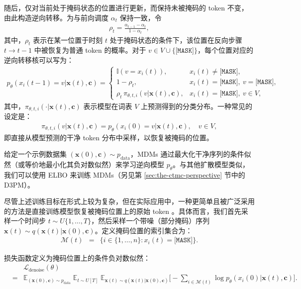 \documentclass[UTF8,a4paper,zihao=-4,oneside,openany]{ctexbook}
\begin{document}
\noindent 随后，仅对当前处于掩码状态的位置进行更新，而保持未被掩码的 token 不变，由此构造逆向转移。为与前向调度 $\alpha_t$ 保持一致，令
\begin{eqnarray}
\rho_t=\frac{\alpha_{t-1}-\alpha_t}{1-\alpha_t},
\label{eq:mdm-unmask-probability}
\end{eqnarray}
其中，$\rho_t$ 表示在某一位置于时刻 $t$ 处于掩码状态的条件下，该位置在反向步骤 $t\to t-1$ 中被恢复为普通 token 的概率。对于 $v\in V\cup\{\texttt{[MASK]}\}$，每个位置对应的逆向转移核可以写为：
\begin{eqnarray}
p_\theta(x_i(t-1)=v| \mathbf{x}(t), \mathbf{c})
=
\begin{cases}
\mathbb{I}\!\left(v=x_i(t)\right), & x_i(t) \neq \texttt{[MASK]},\\
1-\rho_t, & x_i(t)=\texttt{[MASK]},\ v=\texttt{[MASK]},\\
\rho_t\,\pi_{\theta,t,i}\!\left(v | \mathbf{x}(t), \mathbf{c}\right),
& x_i(t)=\texttt{[MASK]},\ v\in V,
\end{cases}
\label{eq:mdm-reverse-keep-or-sample}
\end{eqnarray}
其中，$\pi_{\theta,t,i}(\cdot | \mathbf{x}(t),\mathbf{c})$ 表示模型在词表 $V$ 上预测得到的分类分布。一种常见的设定是：
\begin{eqnarray}
\pi_{\theta,t,i}\!\left(v | \mathbf{x}(t),\mathbf{c}\right)=p_\theta\!\left(x_i(0)=v | \mathbf{x}(t),\mathbf{c}\right), \quad v\in V,
\label{eq:mdm-pi-as-denoise}
\end{eqnarray}
即直接从模型预测的干净 token 分布中采样，以恢复被掩码的位置。

给定一个示例数据集 $(\mathbf{x}(0),\mathbf{c})\sim p_{\text{data}}$，MDMs 通过最大化干净序列的条件似然（或等价地最小化其负对数似然）来学习逆向模型 $p_\theta$。与其他扩散模型类似，我们可以使用 ELBO 来训练 MDMs（另见第 \ref{sec:the-ctmc-perspective} 节中的 D3PM）。

尽管上述训练目标在形式上较为复杂，但在实际应用中，一种更简单且被广泛采用的方法是直接训练模型恢复被掩码位置上的原始 token 。具体而言，我们首先采样一个时间步 $t\sim U\{1,\dots,T\}$，然后采样一个带噪（部分掩码）序列 $\mathbf{x}(t)\sim q(\mathbf{x}(t)| \mathbf{x}(0),\mathbf{c})$。定义掩码位置的索引集合为：
\begin{eqnarray}
\mathcal{M}(t) & = & \{i\in\{1,\dots,n\} : x_i(t)=\texttt{[MASK]}\}.
\end{eqnarray}

\noindent 损失函数定义为掩码位置上的条件负对数似然：
\begin{eqnarray}
& & \mathcal{L}_{\text{denoise}}(\theta) \nonumber \\
&=&
\mathbb{E}_{(\mathbf{x}(0),\mathbf{c})\sim p_{\text{data}}}
\;
\mathbb{E}_{t\sim U[T]}
\;
\mathbb{E}_{\mathbf{x}(t)\sim q(\mathbf{x}(t)| \mathbf{x}(0),\mathbf{c})}
\Bigg[
-\sum_{i\in \mathcal{M}(t)} \log p_\theta\!\left(x_i(0)| \mathbf{x}(t),\mathbf{c}\right)
\Bigg].
\label{eq:mdm-denoise-ce}
\end{eqnarray}
\end{document}
